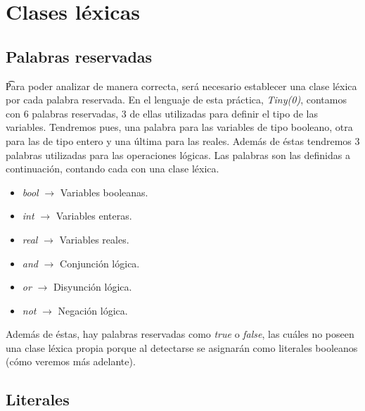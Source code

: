 \section{Clases léxicas}

\subsection{Palabras reservadas}

\t Para poder analizar de manera correcta, será necesario establecer una clase léxica por cada palabra reservada. En el lenguaje de
esta práctica, \textit{Tiny(0)}, contamos con 6 palabras reservadas, 3 de ellas utilizadas para definir el tipo de las variables.
Tendremos pues, una palabra para las variables de tipo booleano, otra para las de tipo entero y una última para las reales. Además
de éstas tendremos 3 palabras utilizadas para las operaciones lógicas. Las palabras son las definidas a continuación, contando cada con
una clase léxica.

\begin{itemize}
    \item \textit{bool} $\rightarrow$ Variables booleanas.
    \item \textit{int} $\rightarrow$ Variables enteras.
    \item \textit{real} $\rightarrow$ Variables reales.
    \item \textit{and} $\rightarrow$ Conjunción lógica.
    \item \textit{or} $\rightarrow$ Disyunción lógica.
    \item \textit{not} $\rightarrow$ Negación lógica.
\end{itemize}

Además de éstas, hay palabras reservadas como \textit{true} o \textit{false}, las cuáles no poseen una clase léxica propia
porque al detectarse se asignarán como literales booleanos (cómo veremos más adelante).

\subsection{Literales}

